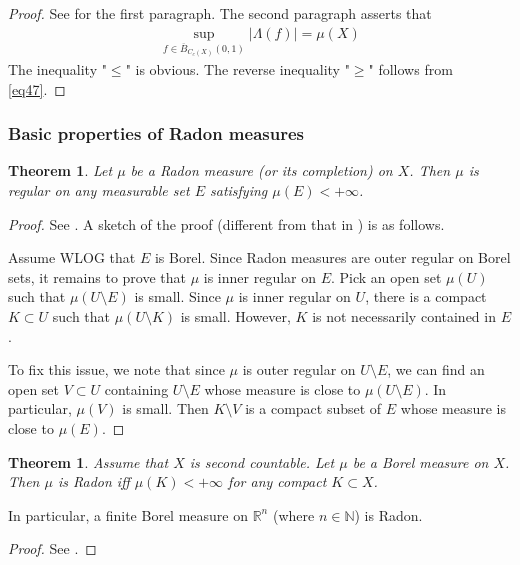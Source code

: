 \documentclass[12pt,b5paper,notitlepage]{article}
\theoremstyle{definition}
\theoremstyle{plain}
\newtheorem{thm}[df]{Theorem}
\newcommand{\ovl}{\overline}
\newcommand{\Nbb}{\mathbb N}
\newcommand{\Rbb}{\mathbb R}
\numberwithin{equation}{section}
\begin{document}
\begin{proof}
See \cite[Sec. 25.3]{Gui-A} for the first paragraph. The second paragraph asserts that
\begin{align*}
\sup_{f\in\ovl B_{C_c(X)}(0,1)}|\Lambda(f)|= \mu(X)
\end{align*}
The inequality "$\leq$" is obvious. The reverse inequality "$\geq$" follows from \eqref{eq47}.
\end{proof}



\subsubsection{Basic properties of Radon measures}

\begin{thm}\label{lb101}
Let $\mu$ be a Radon measure (or its completion) on $X$. Then $\mu$ is regular on any measurable set $E$ satisfying $\mu(E)<+\infty$.
\end{thm}

\begin{proof}
See \cite[Sec. 25.4]{Gui-A}. A sketch of the proof (different from that in \cite{Gui-A}) is as follows. 

Assume WLOG that $E$ is Borel. Since Radon measures are outer regular on Borel sets, it remains to prove that $\mu$ is inner regular on $E$. Pick an open set $\mu(U)$ such that $\mu(U\setminus E)$ is small. Since $\mu$ is inner regular on $U$, there is a compact $K\subset U$ such that $\mu(U\setminus K)$ is small. However, $K$ is not necessarily contained in $E$. 

To fix this issue, we note that since $\mu$ is outer regular on $U\setminus E$, we can find an open set $V\subset U$ containing $U\setminus E$ whose measure is close to $\mu(U\setminus E)$. In particular, $\mu(V)$ is small. Then $K\setminus V$ is a compact subset of $E$ whose measure is close to $\mu(E)$.
\end{proof}



\begin{thm}\label{lb64}
Assume that $X$ is second countable. Let $\mu$ be a Borel measure on $X$. Then $\mu$ is Radon iff $\mu(K)<+\infty$ for any compact $K\subset X$.
\end{thm}

In particular, a finite Borel measure on $\Rbb^n$ (where $n\in\Nbb$) is Radon.

\begin{proof}
See \cite[Sec. 25.5]{Gui-A}.
\end{proof}
\end{document}
